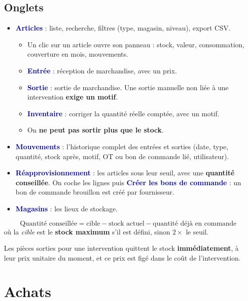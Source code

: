 \documentclass[11pt,a4paper]{article}
\newcommand{\ui}[1]{\textbf{\textcolor{navy}{#1}}}          %
\begin{document}
\subsection{Onglets}

\begin{itemize}
  \item \ui{Articles} : liste, recherche, filtres (type, magasin, niveau), export CSV.
    \begin{itemize}
      \item Un clic sur un article ouvre son panneau : stock, valeur, consommation, couverture en mois, mouvements.
      \item \ui{Entrée} : réception de marchandise, avec un prix.
      \item \ui{Sortie} : sortie de marchandise. Une sortie manuelle non liée à une intervention \textbf{exige un motif}.
      \item \ui{Inventaire} : corriger la quantité réelle comptée, avec un motif.
      \item On \textbf{ne peut pas sortir plus que le stock}.
    \end{itemize}
  \item \ui{Mouvements} : l'historique complet des entrées et sorties (date, type, quantité, stock après, motif, OT ou bon de commande lié, utilisateur).
  \item \ui{Réapprovisionnement} : les articles sous leur seuil, avec une \textbf{quantité conseillée}. On coche les lignes puis \ui{Créer les bons de commande} : un bon de commande brouillon est créé par fournisseur.
  \item \ui{Magasins} : les lieux de stockage.
\end{itemize}

\begin{formule}
\[
\text{Quantité conseillée} = \text{cible} - \text{stock actuel} - \text{quantité déjà en commande}
\]
où la \emph{cible} est le \textbf{stock maximum} s'il est défini, sinon $2 \times$ le seuil.
\end{formule}

\begin{note}
Les pièces sorties pour une intervention quittent le stock \textbf{immédiatement}, à leur prix unitaire du moment, et ce prix est figé dans le coût de l'intervention.
\end{note}

\section{Achats}
\end{document}
